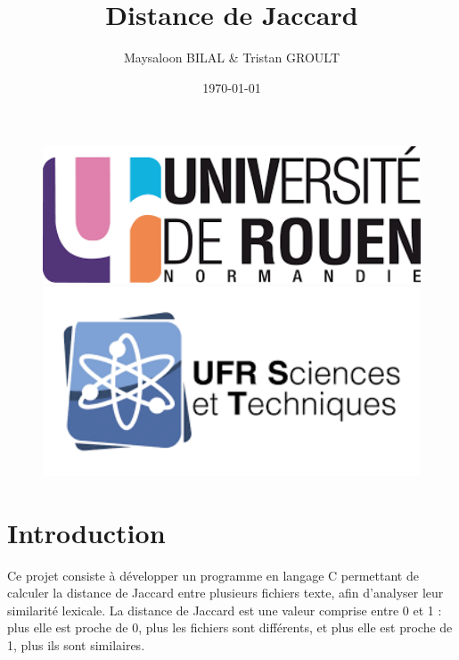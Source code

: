 \documentclass[a4paper, 12pt]{article}
\title{Distance de Jaccard}
\author{Maysaloon BILAL \& Tristan GROULT}
\date{\today}
\begin{document}
\begin{figure}[t]
    \centering
    \begin{minipage}{0.3\textwidth}
        \centering
        \includegraphics[width=1\textwidth]{logo_univ.png}
    \end{minipage}
    \hfill
    \begin{minipage}{0.3\textwidth}
        \centering
        \includegraphics[width=1\textwidth]{ufr_logo.png}
    \end{minipage}
\end{figure}

\maketitle

\clearpage\setcounter{page}{2}

{
\hypersetup{hidelinks} %
\renewcommand{\contentsname}{Sommaire}
\tableofcontents %
}

\clearpage

\section{Introduction}


Ce projet consiste à développer un programme en langage C permettant de calculer la distance de Jaccard entre plusieurs fichiers texte, afin d'analyser leur similarité lexicale. La distance de Jaccard est une valeur comprise entre 0 et 1 : plus elle est proche de 0, plus les fichiers sont différents, et plus elle est proche de 1, plus ils sont similaires.
\end{document}
